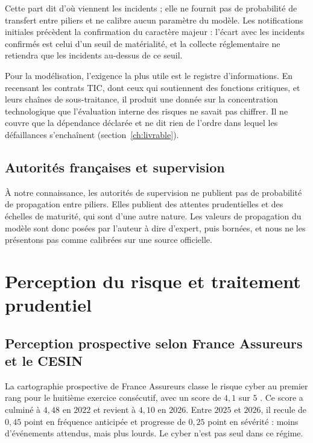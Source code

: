 Cette part dit d'où viennent les incidents ; elle ne fournit pas de probabilité de transfert entre piliers et ne calibre aucun paramètre du modèle. Les notifications initiales précèdent la confirmation du caractère majeur : l'écart avec les
incidents confirmés est celui d'un seuil de matérialité, et la collecte réglementaire ne retiendra que
les incidents au-dessus de ce seuil.

Pour la modélisation, l'exigence la plus utile est le registre d'informations. En recensant les
contrats TIC, dont ceux qui soutiennent des fonctions critiques, et leurs chaînes de sous-traitance, il produit une donnée sur la concentration
technologique que l'évaluation interne des risques ne savait pas chiffrer. Il ne couvre que
la dépendance déclarée et ne dit rien de l'ordre dans lequel les défaillances s'enchaînent
(section~\ref{ch:livrable}).

\subsection{Autorités françaises et supervision}
\label{subsec:supervision-france}

À notre connaissance, les autorités de supervision ne publient pas de probabilité de propagation entre
piliers. Elles publient des attentes prudentielles et des échelles de maturité, qui sont d'une autre nature. Les
valeurs de propagation du modèle sont donc posées par l'auteur à dire d'expert, puis bornées, et nous ne les
présentons pas comme calibrées sur une source officielle.

\section{Perception du risque et traitement prudentiel}
\label{sec:enjeu-prudentiel}

\subsection{Perception prospective selon France Assureurs et le CESIN}
\label{subsec:france-assureurs-cesin}

La cartographie prospective de France Assureurs classe le risque cyber au premier rang pour le
huitième exercice consécutif, avec un score de $4{,}1$ sur $5$ \citep{franceassureurs2026}. Ce score
a culminé à $4{,}48$ en $2022$ et revient à $4{,}10$ en $2026$.
Entre $2025$ et $2026$, il recule de $0{,}45$ point en fréquence anticipée et progresse de
$0{,}25$ point en sévérité : moins d'événements attendus, mais plus lourds. Le cyber n'est pas seul
dans ce régime.

